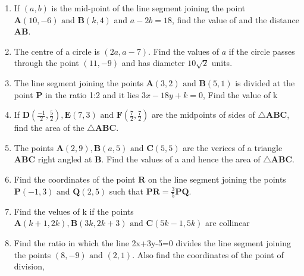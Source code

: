 \documentclass[12pt]{article}
\providecommand{\brak}[1]{\ensuremath{\left(#1\right)}}
\let\vec\mathbf
\begin{document}
\begin{enumerate}
\item If $(a,b)$ is the mid-point of the line segment joining the point $\vec{A}(10,-6)\text{ and }\vec{B}(k,4)$ and $a-2b=18$, find the value of and the distance $\vec{AB}$.
\item The centre of a circle is $(2a,a-7)$. Find the values of $a$ if the circle passes through the point $(11,-9)$ and has diameter $10\sqrt{2}$ units.
\item The line segment joining the points $\vec{A}(3,2)\text{ and }\vec{B}(5,1)$ is divided at the point $\vec{P}$ in the ratio 1:2 and it lies $3x-18y+k=0$, Find the value of k  
\item If $\vec{D}\brak{\frac{-1}{2},\frac{5}{2}},\vec{E}(7,3)\text{ and }\vec{F}\brak{\frac{7}{2},\frac{7}{2}}$ are the midpoints of sides of $\triangle \vec{ABC}$, find the area of the $\triangle \vec{ABC}$.
\item The points $\vec{A}(2,9),\vec{B}(a,5) \text{ and }\vec{C}(5,5)$ are the verices of a triangle $\vec{ABC}$ right angled at $\vec{B}$. Find the values of a and hence the area of $\triangle \vec{ABC}$.
\item Find the coordinates of the point $\vec{R}$ on the line segment joining the points $\vec{P}(-1,3)\text{ and }\vec{Q}(2,5)$ such that $\vec{PR}={\frac{3}{5}}\vec{PQ}$.
\item Find the velues of k if the points $\vec{A}(k+1,2k),\vec{B}(3k,2k+3)\text{ and }\vec{C}(5k-1,5k)$ are collinear
\item Find the ratio in which the line 2x+3y-5=0 divides the line segment joining the points $(8,-9)\text{ and }(2,1)$. Also find the coordinates of the point of division,
 
\end{enumerate}
\end{document}
